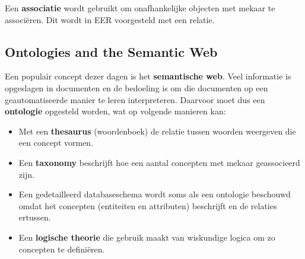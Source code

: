 Een \textbf{associatie} wordt gebruikt om onafhankelijke objecten met mekaar te associ\"eren. Dit wordt in EER voorgesteld met een relatie.

\subsection{Ontologies and the Semantic Web}
Een populair concept dezer dagen is het \textbf{semantische web}. Veel informatie is opgeslagen in documenten en de bedoeling is om die documenten op een geautomatiseerde manier te leren interpreteren. Daarvoor moet dus een \textbf{ontologie} opgesteld worden, wat op volgende manieren kan:
\begin{itemize}
\item Met een \textbf{thesaurus} (woordenboek) de relatie tussen woorden weergeven die een concept vormen.
\item Een \textbf{taxonomy} beschrijft hoe een aantal concepten met mekaar geassocieerd zijn.
\item Een gedetailleerd databaseschema wordt soms als een ontologie beschouwd omdat het concepten (entiteiten en attributen) beschrijft en de relaties ertussen.
\item Een \textbf{logische theorie} die gebruik maakt van wiskundige logica om zo concepten te defini\"eren.
\end{itemize}